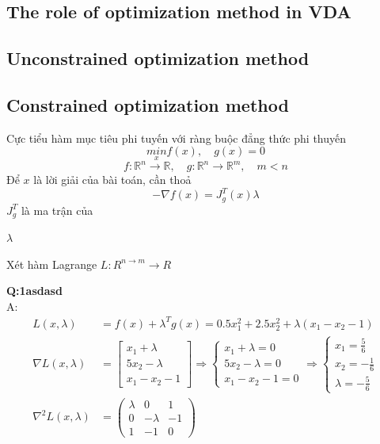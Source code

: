 \subsection{The role of optimization method in VDA}
\subsection{Unconstrained optimization method}



\subsection{Constrained optimization method}


Cực tiểu hàm mục tiêu phi tuyến với ràng buộc đẳng thức phi thuyến
\begin{equation*}
    \underset{x}{min} f(x) , \quad g(x) = 0
\end{equation*}
\begin{equation*}
    f: \mathbb{R}^n \rightarrow \mathbb{R}, \quad g: \mathbb{R}^n \rightarrow \mathbb{R}^m, \quad m < n
\end{equation*}
Để $x$ là lời giải của bài toán, cần thoả
\begin{equation*}
    -\nabla f(x) = J^T_g (x) \lambda
\end{equation*}
$J^T_g$ là ma trận của 

$\lambda$

Xét hàm Lagrange $L: R^{n\rightarrow m}\rightarrow R$


\textbf{Q:1asdasd }\\
A: \begin{align*}
    L (x, \lambda) &= f(x) + \lambda^Tg(x) = 0.5x_1^2 + 2.5x_2^2 + \lambda(x_1-x_2-1)\\
    \nabla L (x, \lambda) &= \begin{bmatrix}
        x_1 + \lambda\\
        5x_2 - \lambda\\
        x_1 - x_2 - 1
    \end{bmatrix}\Rightarrow \begin{cases}
        x_1 + \lambda = 0\\
        5x_2 - \lambda = 0\\
        x_1 - x_2 - 1 = 0
    \end{cases} \Rightarrow \begin{cases}
        x_1 = \frac{5}{6}\\
        x_2 = -\frac{1}{6}\\
        \lambda = -\frac{5}{6}
    \end{cases}\\
    \nabla^2 L (x, \lambda) &= \begin{pmatrix}
        \lambda & 0 & 1\\
        0 & -\lambda & -1\\
        1 & -1 & 0
    \end{pmatrix}\\
\end{align*}



